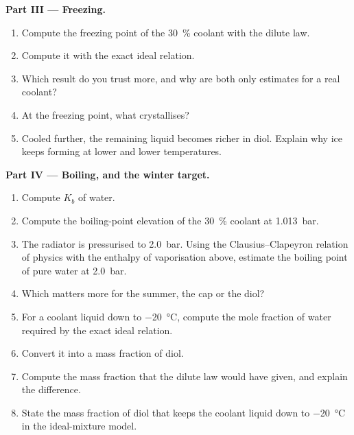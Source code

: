 \begin{problem}
\medskip
\noindent\textbf{Part III --- Freezing.}
\begin{enumerate}[resume]
  \item Compute the freezing point of the \qty{30}{\percent} coolant with the
        dilute law.
  \item Compute it with the exact ideal relation.
  \item Which result do you trust more, and why are both only estimates for a
        real coolant?
  \item At the freezing point, what crystallises?
  \item Cooled further, the remaining liquid becomes richer in diol. Explain
        why ice keeps forming at lower and lower temperatures.
\end{enumerate}

\medskip
\noindent\textbf{Part IV --- Boiling, and the winter target.}
\begin{enumerate}[resume]
  \item Compute $K_b$ of water.
  \item Compute the boiling-point elevation of the \qty{30}{\percent} coolant
        at \qty{1.013}{bar}.
  \item The radiator is pressurised to \qty{2.0}{bar}. Using the
        Clausius--Clapeyron relation of physics with the enthalpy of
        vaporisation above, estimate the boiling point of pure water at
        \qty{2.0}{bar}.
  \item Which matters more for the summer, the cap or the diol?
  \item For a coolant liquid down to \qty{-20}{\celsius}, compute the mole
        fraction of water required by the exact ideal relation.
  \item Convert it into a mass fraction of diol.
  \item Compute the mass fraction that the dilute law would have given, and
        explain the difference.
  \item State the mass fraction of diol that keeps the coolant liquid down to
        \qty{-20}{\celsius} in the ideal-mixture model.
\end{enumerate}
\end{problem}
